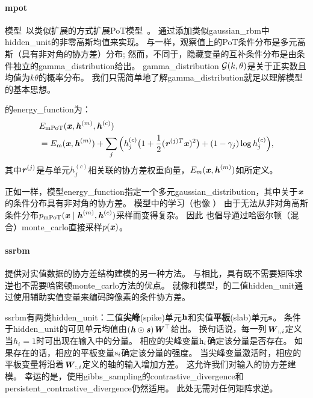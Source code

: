 
\paragraph{\gls{mpot}}
模型~\citep{ranzato+mnih+hinton:2010-short}以类似扩展的方式扩展PoT模型~\citep{Welling2003a-small}。
通过添加类似\gls{gaussian_rbm}中\gls{hidden_unit}的非零高斯均值来实现。
与一样，观察值上的PoT条件分布是多元高斯（具有非对角的协方差）分布; 然而，不同于，隐藏变量的互补条件分布是由条件独立的\gls{gamma_distribution}给出。
\gls{gamma_distribution} $\mathcal{G}(k, \theta)$是关于正实数且均值为$k\theta$的概率分布。
我们只需简单地了解\gls{gamma_distribution}就足以理解模型的基本思想。

的\gls{energy_function}为：
\begin{align}
 &E_{\text{mPoT}}(\boldsymbol{\mathit{x}}, \boldsymbol{\mathit{h}}^{(m)}, \boldsymbol{\mathit{h}}^{(c)}) \\
 &= E_{\text{m}}(\boldsymbol{\mathit{x}}, \boldsymbol{\mathit{h}}^{(m)}) + \sum_j \Big( h_j^{(c)} \big( 1+\frac{1}{2}(\boldsymbol{\mathit{r}}^{(j)T}\boldsymbol{\mathit{x}})^2  \big)
 +(1-\gamma_j)\log h_j^{(c)} \Big),
\end{align}
其中$\boldsymbol{\mathit{r}}^{(j)}$是与单元$h_j^{(c)}$相关联的协方差权重向量，$E_m(\boldsymbol{\mathit{x}}, \boldsymbol{\mathit{h}}^{(m)})$如所定义。

正如一样，模型\gls{energy_function}指定一个多元\gls{gaussian_distribution}，其中关于$\boldsymbol{\mathit{x}}$的条件分布具有非对角的协方差。
模型中的学习（也像 ） 由于无法从非对角高斯条件分布$p_{\text{mPoT}}(\boldsymbol{\mathit{x}}  \mid  \boldsymbol{\mathit{h}}^{(m)}, \boldsymbol{\mathit{h}}^{(c)}) $采样而变得复杂。
因此\citet{ranzato+mnih+hinton:2010-short} 也倡导通过哈密尔顿（混合）\gls{monte_carlo}直接采样$p(\boldsymbol{\mathit{x}})$。


\paragraph{\gls{ssrbm}} \citep{Courville+al-2011}提供对实值数据的协方差结构建模的另一种方法。
与相比，具有既不需要矩阵求逆也不需要哈密顿\gls{monte_carlo}方法的优点。
就像和模型，的二值\gls{hidden_unit}通过使用辅助实值变量来编码跨像素的条件协方差。


\gls{ssrbm}有两类\gls{hidden_unit}：二值\textbf{尖峰}(spike)单元$\mathbf{h}$和实值\textbf{平板}(slab)单元$\mathbf{s}$。
条件于\gls{hidden_unit}的可见单元均值由$(\boldsymbol{\mathit{h}} \odot \boldsymbol{\mathit{s}})\boldsymbol{\mathit{W}}^\top$给出。
换句话说，每一列$\boldsymbol{\mathit{W}}_{:,i}$定义当$h_i=1$时可出现在输入中的分量。
相应的尖峰变量$\mathrm{h}_i$确定该分量是否存在。
如果存在的话，相应的平板变量$\mathrm{s}_i$确定该分量的强度。
当尖峰变量激活时，相应的平板变量将沿着$\boldsymbol{\mathit{W}}_{:,i}$定义的轴的输入增加方差。
这允许我们对输入的协方差建模。
幸运的是，使用\gls{gibbs_sampling}的\gls{contrastive_divergence}和\gls{persistent_contrastive_divergence}仍然适用。
此处无需对任何矩阵求逆。

